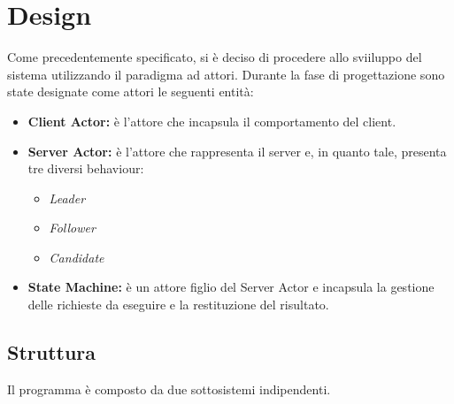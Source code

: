 \section{Design}

Come precedentemente specificato, si è deciso di procedere allo sviiluppo del sistema utilizzando il paradigma ad attori. Durante la fase di progettazione sono state designate come attori le seguenti entità:

\begin{itemize}
	\item{\textbf{Client Actor:}} è l'attore che incapsula il comportamento del client.
	\item{\textbf{Server Actor:}} è l'attore che rappresenta il server e, in quanto tale, presenta tre diversi behaviour:
		\begin{itemize}
		 	\item{\emph{Leader}}
		 	\item{\emph{Follower}} 
		 	\item{\emph{Candidate}} 
		 \end{itemize} 
	\item{\textbf{State Machine:}} è un attore figlio del Server Actor e incapsula la gestione delle richieste da eseguire e la restituzione del risultato.
\end{itemize}



\subsection{Struttura}
Il programma è composto da due sottosistemi indipendenti.

